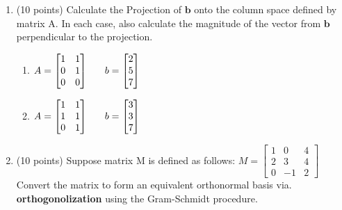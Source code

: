 \documentclass{article}%
\begin{document}
\begin{enumerate}

    \item (10 points) Calculate the Projection of \emph{$\mathbf{b}$} onto the column space defined by matrix A.  In each case, also calculate the magnitude of the vector from $\mathbf{b}$ perpendicular to the projection.
    \begin{enumerate}
        \item $A = \begin{bmatrix}
            1 & 1\\
            0 & 1\\
            0 & 0
        \end{bmatrix}\hspace{4ex}
        b = \begin{bmatrix}
            2\\
            5\\
            7
        \end{bmatrix}$
        
        \item $A = \begin{bmatrix}
            1 & 1\\
            1 & 1\\
            0 & 1
        \end{bmatrix}\hspace{4ex}
        b = \begin{bmatrix}
            3\\
            3\\
            7
        \end{bmatrix}$
    \end{enumerate}



    \item (10 points) Suppose matrix M is defined as follows:
    $M = \begin{bmatrix}
            1 & 0 & 4\\
            2 & 3 & 4\\
            0 & -1 & 2
        \end{bmatrix}$
    Convert the matrix to form an equivalent orthonormal basis via. \textbf{orthogonolization} using the Gram-Schmidt procedure.


    
\end{enumerate}
\end{document}
